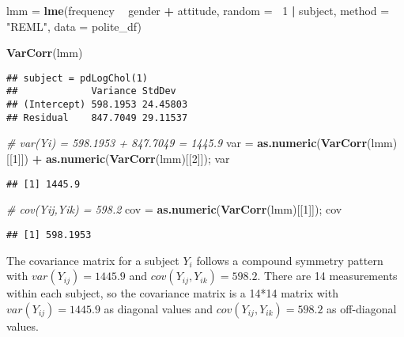 \documentclass[]{article}
\newenvironment{Shaded}{\begin{snugshade}}{\end{snugshade}}
\newcommand{\KeywordTok}[1]{\textcolor[rgb]{0.13,0.29,0.53}{\textbf{#1}}}
\newcommand{\DataTypeTok}[1]{\textcolor[rgb]{0.13,0.29,0.53}{#1}}
\newcommand{\DecValTok}[1]{\textcolor[rgb]{0.00,0.00,0.81}{#1}}
\newcommand{\StringTok}[1]{\textcolor[rgb]{0.31,0.60,0.02}{#1}}
\newcommand{\CommentTok}[1]{\textcolor[rgb]{0.56,0.35,0.01}{\textit{#1}}}
\newcommand{\OperatorTok}[1]{\textcolor[rgb]{0.81,0.36,0.00}{\textbf{#1}}}
\newcommand{\NormalTok}[1]{#1}
\begin{document}
\begin{Shaded}
\begin{Highlighting}[]
\NormalTok{lmm =}\StringTok{ }\KeywordTok{lme}\NormalTok{(frequency }\OperatorTok{~}\StringTok{ }\NormalTok{gender }\OperatorTok{+}\StringTok{ }\NormalTok{attitude, }\DataTypeTok{random =} \OperatorTok{~}\DecValTok{1} \OperatorTok{|}\StringTok{ }\NormalTok{subject, }\DataTypeTok{method =} \StringTok{"REML"}\NormalTok{, }\DataTypeTok{data =}\NormalTok{ polite_df)}

\KeywordTok{VarCorr}\NormalTok{(lmm)}
\end{Highlighting}
\end{Shaded}

\begin{verbatim}
## subject = pdLogChol(1) 
##             Variance StdDev  
## (Intercept) 598.1953 24.45803
## Residual    847.7049 29.11537
\end{verbatim}

\begin{Shaded}
\begin{Highlighting}[]
\CommentTok{# var(Yi) = 598.1953 + 847.7049 = 1445.9}
\NormalTok{var =}\StringTok{ }\KeywordTok{as.numeric}\NormalTok{(}\KeywordTok{VarCorr}\NormalTok{(lmm)[[}\DecValTok{1}\NormalTok{]]) }\OperatorTok{+}\StringTok{ }\KeywordTok{as.numeric}\NormalTok{(}\KeywordTok{VarCorr}\NormalTok{(lmm)[[}\DecValTok{2}\NormalTok{]]); var }
\end{Highlighting}
\end{Shaded}

\begin{verbatim}
## [1] 1445.9
\end{verbatim}

\begin{Shaded}
\begin{Highlighting}[]
\CommentTok{# cov(Yij,Yik) = 598.2}
\NormalTok{cov =}\StringTok{ }\KeywordTok{as.numeric}\NormalTok{(}\KeywordTok{VarCorr}\NormalTok{(lmm)[[}\DecValTok{1}\NormalTok{]]); cov }
\end{Highlighting}
\end{Shaded}

\begin{verbatim}
## [1] 598.1953
\end{verbatim}

The covariance matrix for a subject \(Y_i\) follows a compound symmetry
pattern with \(var(Y_{ij})=1445.9\) and \(cov(Y_{ij},Y_{ik})=598.2\).
There are 14 measurements within each subject, so the covariance matrix
is a 14*14 matrix with \(var(Y_{ij})=1445.9\) as diagonal values and
\(cov(Y_{ij},Y_{ik})=598.2\) as off-diagonal values.
\end{document}
